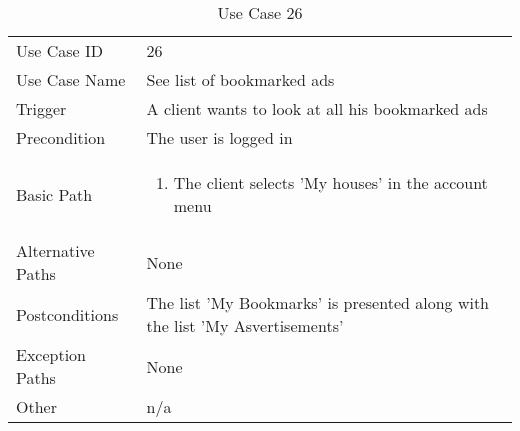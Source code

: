 \begin{table}[H]
\centering
\label{table-use-case-26}
\begin{tabular}{|p{3cm}|p{10cm}}
Use Case ID       & 26                                                           
\\
Use Case Name     & See list of bookmarked ads                                                         
\\
Trigger           & A client wants to look at all his bookmarked ads                                          
\\
Precondition      & The user is logged in                                                
\\
Basic Path        & \begin{enumerate}
\item The client selects 'My houses' in the account menu
\end{enumerate} 
     \\
Alternative Paths & None                          \\
Postconditions    & The list 'My Bookmarks' is presented along with the list 'My
Asvertisements'
\\
Exception Paths   & None                          \\
Other             & n/a                                                                                                                                                                                                        
\end{tabular}
\caption{Use Case 26}
\end{table}

